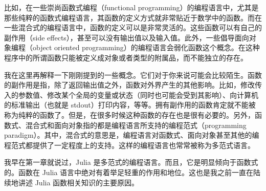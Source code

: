 比如，在一些崇尚函数式编程（functional programming）的编程语言中，尤其是那些纯粹的函数式编程语言，其函数的定义方式就非常贴近于数学中的函数。而在一些混合式的编程语言中，函数的定义可以是非常灵活的。这些函数可以有自己的副作用（side effects），甚至可以没有输出值以及输入值。此外，一些倡导面向对象编程（object oriented programming）的编程语言会弱化函数这个概念。在这种程序中的所谓函数只能被定义成对象或者类型的附属品，而不能独立的存在。

我在这里再解释一下刚刚提到的一些概念。它们对于你来说可能会比较陌生。函数的副作用是指，除了返回输出值之外，函数对外界产生的其他影响。比如，修改传入的参数值、修改某个全局的变量或状态（同时也可能会受到其影响）、向计算机的标准输出（也就是 stdout）打印内容，等等。拥有副作用的函数肯定就不能被称为纯粹的函数了。但是，在很多时候这种函数的存在也是很有必要的。另外，函数式、混合式和面向对象指的都是编程语言所支持的编程范式（programming paradigm）。其中，混合式的意思是，编程语言对函数式、面向对象甚至其他的编程范式都提供了一定程度上的支持。这样的编程语言也常常被称为多范式语言。

我早在第一章就说过，Julia 是多范式的编程语言。而且，它是明显倾向于函数式的。函数在 Julia 语言中绝对有着举足轻重的作用和地位。这也是我之前一直在陆续地讲述 Julia 函数相关知识的主要原因。
